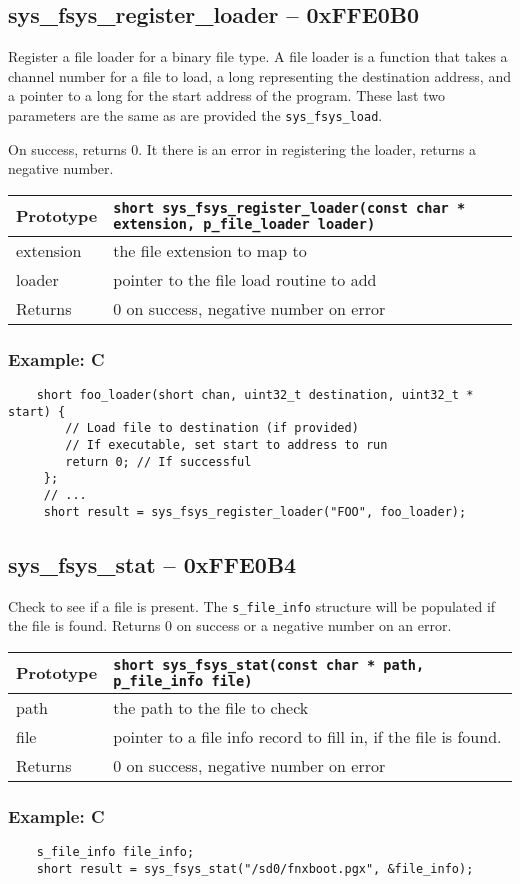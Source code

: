 \subsection*{sys\_fsys\_register\_loader -- 0xFFE0B0}
Register a file loader for a binary file type.
A file loader is a function that takes a channel number for a file to load, a long representing the destination address, and a pointer to a long for the start address of the program. These last two parameters are the same as are provided the \verb+sys_fsys_load+.

On success, returns 0. It there is an error in registering the loader, returns a negative number.

\bigskip

\begin{tabular}{|l||l|} \hline
Prototype & \lstinline!short sys_fsys_register_loader(const char * extension, p_file_loader loader)! \\ \hline
extension & the file extension to map to \\ \hline
loader & pointer to the file load routine to add \\ \hline
Returns & 0 on success, negative number on error \\ \hline
\end{tabular}

\subsubsection*{Example: C}
\begin{lstlisting}
    short foo_loader(short chan, uint32_t destination, uint32_t * start) {
        // Load file to destination (if provided)
        // If executable, set start to address to run
        return 0; // If successful
     };
     // ...
     short result = sys_fsys_register_loader("FOO", foo_loader);
\end{lstlisting}

\subsection*{sys\_fsys\_stat -- 0xFFE0B4}
Check to see if a file is present. The \verb+s_file_info+ structure will be populated if the file is found.
Returns 0 on success or a negative number on an error.

\bigskip

\begin{tabular}{|l||l|} \hline
Prototype & \lstinline!short sys_fsys_stat(const char * path, p_file_info file)! \\ \hline
path & the path to the file to check \\ \hline
file & pointer to a file info record to fill in, if the file is found. \\ \hline
Returns & 0 on success, negative number on error \\ \hline
\end{tabular}

\subsubsection*{Example: C}
\begin{lstlisting}
    s_file_info file_info;
    short result = sys_fsys_stat("/sd0/fnxboot.pgx", &file_info);
\end{lstlisting}